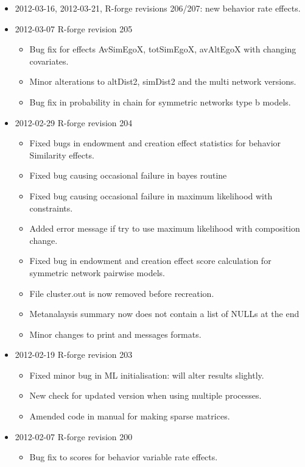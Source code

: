 \documentclass[a4paper,fleqn,11pt]{article}
\newcommand{\+}{\, + \,}
\begin{document}
{\begin{small}
\begin{itemize}
\begin{itemize}
  with movements only in one direction.
\end{itemize}
\item 2012-03-16, 2012-03-21, R-forge revisions 206/207: new behavior rate
  effects.
\item 2012-03-07 R-forge revision 205
\begin{itemize}
\item Bug fix for effects AvSimEgoX, totSimEgoX, avAltEgoX with changing
  covariates.
\item Minor alterations to altDist2, simDist2 and the multi network
  versions.
\item Bug fix in probability in chain for symmetric networks type b models.
\end{itemize}
\item 2012-02-29 R-forge revision 204
\begin{itemize}
\item Fixed bugs in endowment and creation effect statistics for behavior
  Similarity effects.
\item Fixed bug causing occasional failure in bayes routine
\item Fixed bug causing occasional failure in maximum likelihood with
  constraints.
\item Added error message if try to use maximum likelihood with composition
  change.
\item Fixed bug in endowment and creation effect score calculation for symmetric
  network pairwise models.
\item File cluster.out is now removed before recreation.
\item Metanalaysis summary now does not contain a list of NULLs at the end
\item Minor changes to print and messages formats.
\end{itemize}
\item 2012-02-19 R-forge revision 203
\begin{itemize}
\item Fixed minor bug in ML initialisation: will alter results slightly.
\item New check for updated version when using multiple processes.
\item Amended code in manual for making sparse matrices.
\end{itemize}
\item 2012-02-07 R-forge revision 200
\begin{itemize}
\item Bug fix to scores for behavior variable rate effects.

\end{itemize}
\end{itemize}
\end{small}}
\end{document}

